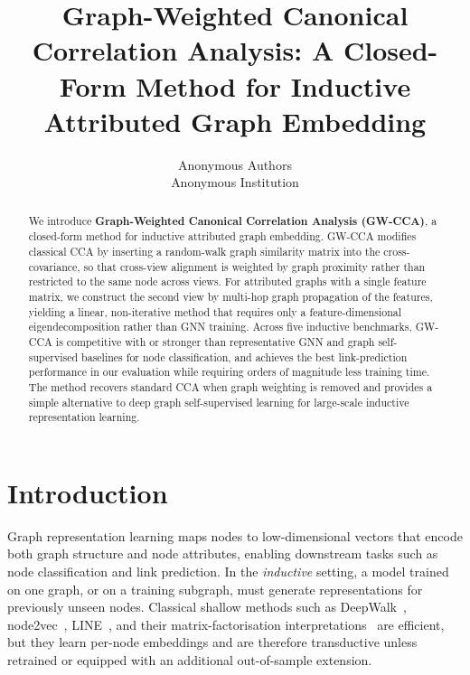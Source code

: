\documentclass{article}
\title[Graph-Weighted CCA for Inductive Attributed Graph Embedding]
      {Graph-Weighted Canonical Correlation Analysis: A Closed-Form Method for Inductive Attributed Graph Embedding}
\author[Anonymous]{%
Anonymous Authors\\
Anonymous Institution\\
\email{anonymous@example.com}}
\begin{document}
\maketitle

\begin{abstract}
We introduce \textbf{Graph-Weighted Canonical Correlation Analysis (GW-CCA)},
a closed-form method for inductive attributed graph embedding. GW-CCA
modifies classical CCA by inserting a random-walk graph similarity matrix
into the cross-covariance, so that cross-view alignment is weighted by
graph proximity rather than restricted to the same node across views. For
attributed graphs with a single feature matrix, we construct the second
view by multi-hop graph propagation of the features, yielding a linear,
non-iterative method that requires only a feature-dimensional
eigendecomposition rather than GNN training. Across five inductive
benchmarks, GW-CCA is competitive with or stronger than representative
GNN and graph self-supervised baselines for node classification, and
achieves the best link-prediction performance in our evaluation while
requiring orders of magnitude less training time. The method recovers
standard CCA when graph weighting is removed and provides a simple
alternative to deep graph self-supervised learning for large-scale
inductive representation learning.
\end{abstract}

\section{Introduction}
\label{sec:intro}

Graph representation learning maps nodes to low-dimensional vectors that
encode both graph structure and node attributes, enabling downstream tasks
such as node classification and link prediction. In the \emph{inductive}
setting, a model trained on one graph, or on a training subgraph, must
generate representations for previously unseen nodes. Classical shallow
methods such as DeepWalk~\citep{perozzi2014deepwalk},
node2vec~\citep{grover2016node2vec}, LINE~\citep{tang2015line}, and their
matrix-factorisation interpretations~\citep{qiu2018network} are efficient,
but they learn per-node embeddings and are therefore transductive unless
retrained or equipped with an additional out-of-sample extension.
\end{document}
